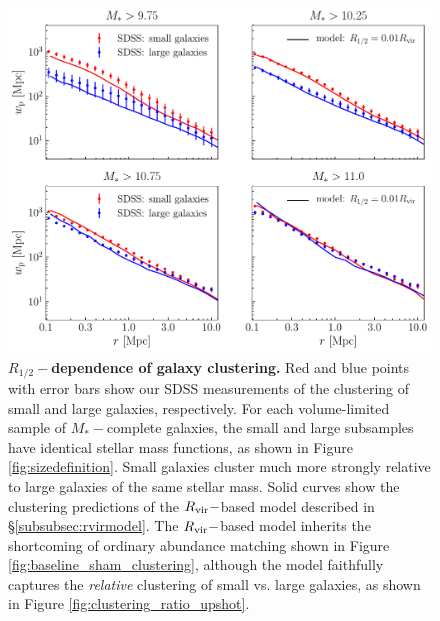 \documentclass[usenatbib,usegraphicx,letterpaper]{mn2e}
\newcommand{\rhalf}{R_{1/2}}
\newcommand{\mstar}{M_{\ast}}
\newcommand{\rvir}{R_{\rm vir}}
\begin{document}
\begin{figure}
\centering
\includegraphics[width=12cm]{FIGS/rvir_only_wp_large_small_absolute.pdf}
\caption{
{\bf $\rhalf-$dependence of galaxy clustering.}
Red and blue points with error bars show our SDSS measurements of the clustering of small and large galaxies, respectively. For each volume-limited sample of $\mstar-$complete galaxies, the small and large subsamples have identical stellar mass functions, as shown in Figure \ref{fig:sizedefinition}. Small galaxies cluster much more strongly relative to large galaxies of the same stellar mass. Solid curves show the clustering predictions of the $\rvir-$based model described in \S\ref{subsubsec:rvirmodel}. The $\rvir-$based model inherits the shortcoming of ordinary abundance matching shown in Figure \ref{fig:baseline_sham_clustering}, although the model faithfully captures the {\em relative} clustering of small vs. large galaxies, as shown in Figure \ref{fig:clustering_ratio_upshot}.
}
\label{fig:rvir_only_clustering_absolute}
\end{figure}
\end{document}
